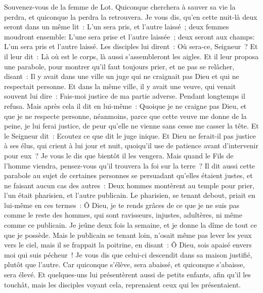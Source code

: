 \begin{multicols}{2}
Souvenez-vous de la femme de Lot.
Quiconque cherchera à sauver sa vie la perdra, et quiconque la perdra la retrouvera.
Je vous dis, qu'en cette nuit-là deux seront dans un même lit~: L'un sera pris, et l'autre laissé~;
deux femmes moudront ensemble: L'une sera prise et l'autre laissée~;
deux seront aux champs: L'un sera pris et l'autre laissé.
Les disciples lui dirent~: Où sera-ce, Seigneur~? Et il leur dit~: Là où est le corps, là aussi s'assembleront les aigles.
\VerseOne{}Et il leur proposa une parabole, pour montrer qu'il faut toujours prier, et ne pas se relâcher,
disant~: Il y avait dans une ville un juge qui ne craignait pas Dieu et qui ne respectait personne.
Et dans la même ville, il y avait une veuve, qui venait souvent lui dire~: Fais-moi justice de ma partie adverse.
Pendant longtemps il refusa. Mais après cela il dit en lui-même~: Quoique je ne craigne pas Dieu, et que je ne respecte personne,
néanmoins, parce que cette veuve me donne de la peine, je lui ferai justice, de peur qu'elle ne vienne sans cesse me casser la tête.
Et le Seigneur dit~: Ecoutez ce que dit le juge inique.
Et Dieu ne ferait-il pas justice à ses élus, qui crient à lui jour et nuit, quoiqu'il use de patience avant d'intervenir pour eux~?
Je vous le dis que bientôt il les vengera. Mais quand le Fils de l'homme viendra, pensez-vous qu'il trouvera la foi sur la terre~?
Il dit aussi cette parabole au sujet de certaines personnes se persuadant qu'elles étaient justes, et ne faisant aucun cas des autres~:
Deux hommes montèrent au temple pour prier, l'un était pharisien, et l'autre publicain.
Le pharisien, se tenant debout, priait en lui-même en ces termes~: Ô Dieu, je te rends grâces de ce que je ne suis pas comme le reste des hommes, qui sont ravisseurs, injustes, adultères, ni même comme ce publicain.
Je jeûne deux fois la semaine, et je donne la dîme de tout ce que je possède.
Mais le publicain se tenant loin, n'osait même pas lever les yeux vers le ciel, mais il se frappait la poitrine, en disant~: Ô Dieu, sois apaisé envers moi qui suis pécheur~!
Je vous dis que celui-ci descendit dans sa maison justifié, plutôt que l'autre. Car quiconque s'élève, sera abaissé, et quiconque s'abaisse, sera élevé.
Et quelques-uns lui présentèrent aussi de petits enfants, afin qu'il les touchât, mais les disciples voyant cela, reprenaient ceux qui les présentaient.

\end{multicols}
